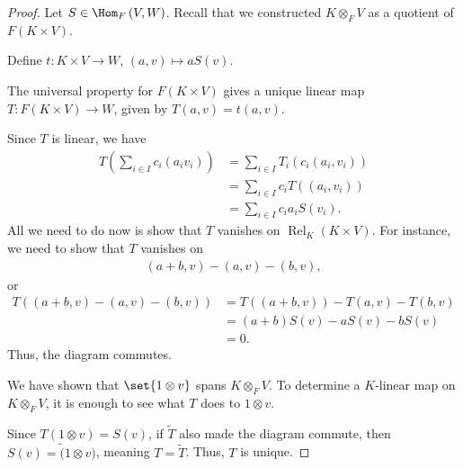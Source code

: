 \documentclass[10pt]{mypackage}
\begin{document}
  \begin{proof}
    Let $S\in \Hom_{F}\left(V,W\right)$. Recall that we constructed $K\otimes_{F}V$ as a quotient of $F\left(K\times V\right)$.\newline

    Define $t: K\times V \rightarrow W$, $\left(a,v\right) \mapsto aS(v)$.\newline

    The universal property for $F\left(K\times V\right)$ gives a unique linear map $T: F\left(K\times V\right) \rightarrow W$, given by $T\left(a,v\right) = t\left(a,v\right)$.\newline

  Since $T$ is linear, we have
  \begin{align*}
    T\left(\sum_{i\in I}c_i\left(a_iv_i\right)\right) &= \sum_{i\in I}T_i\left(c_i\left(a_i,v_i\right)\right)\\
                                                      &= \sum_{i\in I}c_iT\left(\left(a_i,v_i\right)\right)\\
                                                      &= \sum_{i\in I}c_ia_iS\left(v_i\right).
  \end{align*}
  All we need to do now is show that $T$ vanishes on $\operatorname{Rel}_{K}\left(K\times V\right)$. For instance, we need to show that $T$ vanishes on
  \begin{align*}
    \left(a+b,v\right) - \left(a,v\right)-\left(b,v\right),
  \end{align*}
  or
  \begin{align*}
    T\left(\left(a + b,v\right)-\left(a,v\right) - \left(b,v\right)\right) &= T\left(\left(a+b,v\right)\right) - T\left(a,v\right) - T\left(b,v\right)\\
                                                                           &= \left(a+b\right)S(v) - aS(v) - bS(v)\\
                                                                           &= 0.
  \end{align*}
  Thus, the diagram commutes.\newline

  We have shown that $\set{1\otimes v}$ spans $K\otimes_{F}V$. To determine a $K$-linear map on $K\otimes_{F}V$, it is enough to see what $T$ does to $1\otimes v$.\newline

  Since $T\left(1\otimes v\right) = S(v)$, if $\tilde{T}$ also made the diagram commute, then $S(v) = \tilde(1\otimes v)$, meaning $T = \tilde{T}$. Thus, $T$ is unique.
  \end{proof}
\end{document}
